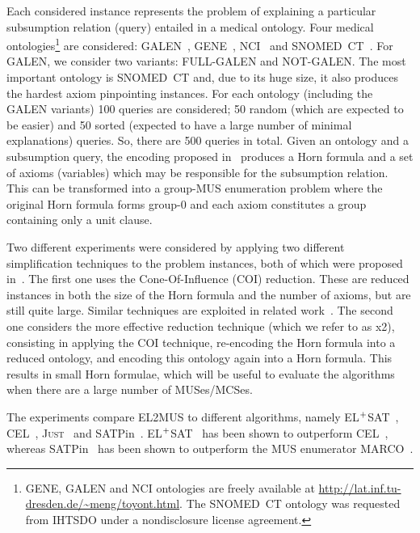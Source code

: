 \documentclass{llncs}
\newcommand{\tn}{\textnormal}
\newcommand{\elsat}{EL$^{\tn{+}}$SAT\xspace}
\newcommand{\just}{\textsc{Just}\xspace}
\begin{document}
Each considered instance represents the problem of explaining a particular 
subsumption relation (query) entailed in a medical ontology. Four
medical ontologies\footnote{GENE, GALEN and NCI ontologies are freely
  available at
  \url{http://lat.inf.tu-dresden.de/~meng/toyont.html}. The SNOMED~CT 
  ontology was requested from IHTSDO under a nondisclosure license
  agreement.} are considered: GALEN~\cite{rector-97}, GENE~\cite{ashburner-ng00},
NCI~\cite{sioutos-jbi07} and
SNOMED~CT~\cite{spackman-amia97}.  For GALEN, we consider two
variants: FULL-GALEN and NOT-GALEN. The most important ontology is
SNOMED~CT and, due to its huge size, it also produces the hardest
axiom pinpointing instances.
For each ontology (including the GALEN variants) 100 queries are considered; 50 random (which are expected to be easier) and 50 sorted (expected to have a large number of minimal explanations) queries. 
So, there are 500 queries in total.
Given an ontology and a subsumption query, the encoding proposed in~\cite{sebastiani-cade09,sebastiani-tr15} produces a Horn formula and a set of axioms (variables) which may be responsible for the subsumption relation. This can be transformed into a group-MUS enumeration problem where the original Horn formula forms group-0 and each axiom constitutes a group containing only a unit clause.


Two different experiments were considered by applying two 
different simplification techniques to the problem instances,
both of which were proposed in~\cite{sebastiani-tr15}. The first one uses 
the Cone-Of-Influence (COI) reduction. 
These are reduced instances in both the size of the 
Horn formula and the number of axioms, but are still quite large. 
Similar techniques are exploited in
related work~\cite{baader-ijcar06,ludwig-ore14,mp-tr15}. 
The second one considers the more effective reduction technique 
(which we refer to as x2), consisting in applying the COI technique,
re-encoding the Horn formula into a reduced ontology, and encoding
this ontology again into a Horn formula. This results in small Horn
formulae, which will be useful to evaluate the algorithms when there
are a large number of MUSes/MCSes.

The experiments compare EL2MUS to different algorithms, namely
\elsat~\cite{sebastiani-cade09,sebastiani-tr15},
CEL~\cite{baader-ijcar06}, \just~\cite{ludwig-ore14} 
and SATPin~\cite{mp-tr15}.
\elsat~\cite{sebastiani-tr15} has been shown to outperform
CEL~\cite{baader-ijcar06}, whereas SATPin~\cite{mp-tr15} has been
shown to outperform the MUS enumerator MARCO~\cite{lpmms-cj15}.
\end{document}
